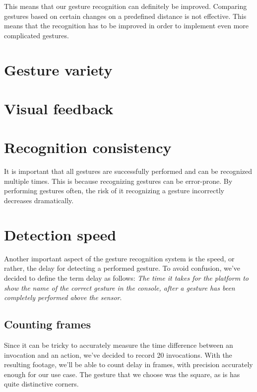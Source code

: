 \documentclass[a4paper]{article}
\begin{document}
  This means that our gesture recognition can definitely be improved. Comparing
  gestures based on certain changes on a predefined distance is not effective.
  This means that the recognition has to be improved in order to implement even
  more complicated gestures.

  \section*{Gesture variety}

  \section*{Visual feedback}

  \section*{Recognition consistency}
  It is important that all gestures are successfully performed and can be recognized
  multiple times. This is because recognizing gestures can be error-prone. By
  performing gestures often, the risk of it recognizing a gesture incorrectly
  decreases dramatically.

  \section*{Detection speed}
  Another important aspect of the gesture recognition system is the speed, or
  rather, the delay for detecting a performed gesture. To avoid confusion, we've
  decided to define the term delay as follows: \textit{The time it takes for the
    platform to show the name of the correct gesture in the console, after a
    gesture has been completely performed above the sensor}.

  \subsection*{Counting frames}
  Since it can be tricky to accurately measure the time difference between an
  invocation and an action, we've decided to record 20 invocations.
  With the resulting footage, we'll be able to count delay in
  frames, with precision accurately enough for our use case. The gesture that we
  choose was the square, as is has quite distinctive corners.
\end{document}
